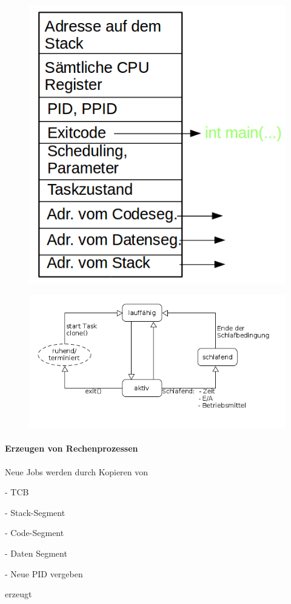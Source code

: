 \documentclass[12pt,a4paper,oneside,ngerman]{article}
\begin{document}
\begin{figure}[H]
	\centering
	\includegraphics[scale=0.5]{umlet/TCB.png}
\end{figure}

\begin{figure}[H]
	\centering
	\includegraphics[scale=0.8]{umlet/taskzustand.png}
\end{figure}

\paragraph{Erzeugen von Rechenprozessen}
Neue Jobs werden durch Kopieren von
\begin{description}
	\item - TCB
	\item - Stack-Segment
	\item - Code-Segment
	\item - Daten Segment
	\item - Neue PID vergeben
\end{description}
erzeugt
\end{document}
